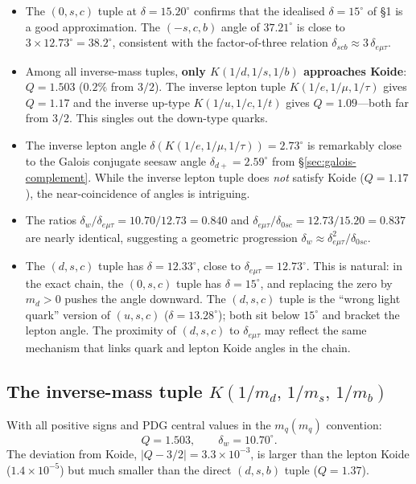 \documentclass[11pt]{article}
\begin{document}
\begin{itemize}
  \item The $(0,s,c)$ tuple at $\delta = 15.20^\circ$ confirms that
    the idealised $\delta = 15^\circ$ of \S1 is a good approximation.
    The $(-s,c,b)$ angle of $37.21^\circ$
    is close to $3\times 12.73^\circ = 38.2^\circ$, consistent with
    the factor-of-three relation $\delta_{scb}\approx 3\,\delta_{e\mu\tau}$.

  \item Among all inverse-mass tuples, \textbf{only $K(1/d,1/s,1/b)$
    approaches Koide}: $Q = 1.503$ ($0.2\%$ from $3/2$).
    The inverse lepton tuple $K(1/e,1/\mu,1/\tau)$ gives $Q = 1.17$
    and the inverse up-type $K(1/u,1/c,1/t)$ gives $Q=1.09$---both
    far from $3/2$.  This singles out the down-type quarks.

  \item The inverse lepton angle $\delta(K(1/e,1/\mu,1/\tau)) = 2.73^\circ$
    is remarkably close to the Galois conjugate seesaw angle
    $\delta_{d+} = 2.59^\circ$ from \S\ref{sec:galois-complement}.  While the inverse lepton
    tuple does \emph{not} satisfy Koide ($Q=1.17$), the near-coincidence
    of angles is intriguing.

  \item The ratios $\delta_w/\delta_{e\mu\tau} = 10.70/12.73 = 0.840$
    and $\delta_{e\mu\tau}/\delta_{0sc} = 12.73/15.20 = 0.837$
    are nearly identical, suggesting a geometric progression
    $\delta_w \approx \delta_{e\mu\tau}^2/\delta_{0sc}$.

  \item The $(d,s,c)$ tuple has $\delta = 12.33^\circ$, close to
    $\delta_{e\mu\tau} = 12.73^\circ$.  This is natural: in the exact
    chain, the $(0,s,c)$ tuple has $\delta = 15^\circ$, and
    replacing the zero by $m_d > 0$ pushes the angle downward.
    The $(d,s,c)$ tuple is the ``wrong light quark'' version of $(u,s,c)$
    ($\delta = 13.28^\circ$); both sit below $15^\circ$ and bracket
    the lepton angle.  The proximity of $(d,s,c)$ to $\delta_{e\mu\tau}$
    may reflect the same mechanism that links quark and lepton
    Koide angles in the chain.
\end{itemize}

\subsection{The inverse-mass tuple $K(1/m_d,\,1/m_s,\,1/m_b)$}

With all positive signs and PDG central values in the $m_q(m_q)$ convention:
\[
  Q = 1.503,\qquad \delta_w = 10.70^\circ.
\]
The deviation from Koide, $|Q - 3/2| = 3.3\times 10^{-3}$, is
larger than the lepton Koide ($1.4\times 10^{-5}$) but much
smaller than the direct $(d,s,b)$ tuple ($Q=1.37$).
\end{document}
